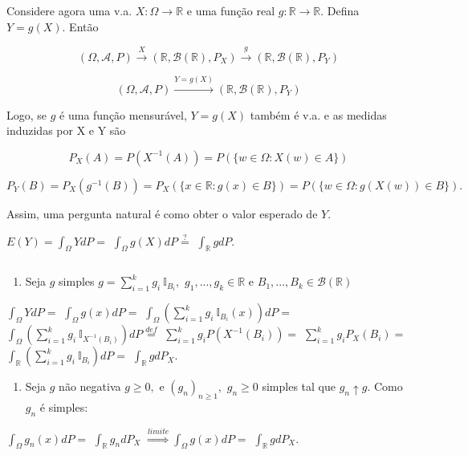 \documentclass[
]{book}
\providecommand{\tightlist}{%
  \setlength{\itemsep}{0pt}\setlength{\parskip}{0pt}}
\begin{document}
Considere agora uma v.a. \(X: \Omega \longrightarrow \mathbb{R}\) e uma função real \(g: \mathbb{R} \longrightarrow \mathbb{R}\). Defina \(Y = g(X)\). Então

\[(\Omega, \mathcal{A},P) \overset{X}{\longrightarrow}(\mathbb{R},\mathcal{B}(\mathbb{R}),P_X)\overset{g}{\longrightarrow}(\mathbb{R},\mathcal{B}(\mathbb{R}),P_Y)\]

\[(\Omega, \mathcal{A},P)\overset{Y = g(X)}{\longrightarrow}(\mathbb{R},\mathcal{B}(\mathbb{R}),P_Y)\]

Logo, se \(g\) é uma função mensurável, \(Y=g(X)\) também é v.a. e as medidas induzidas por X e Y são

\[P_X(A) = P(X^{-1}(A)) = P\left(\{w \in \Omega : X(w) \in A\}\right)\]

\[P_Y(B) = P_X(g^{-1}(B)) = P_X\left(\{x \in \mathbb{R} : g(x) \in B\}\right) = P\left(\{w \in \Omega : g\left(X(w)\right) \in B\}\right).\]

Assim, uma pergunta natural é como obter o valor esperado de \(Y\).

\(E(Y) = \int_\Omega YdP=\) \(\int_\Omega g(X)dP \overset{?}{=}\) \(\int_{\mathbb{R}}gdP.\)

\(~\)

\begin{enumerate}
\def\labelenumi{(\arabic{enumi})}
\tightlist
\item
  Seja \(g\) simples \(g = \sum_{i=1}^kg_i~\mathbb{I}_{B_i},\) \(g_1,...,g_k \in \mathbb{R}\) e \(B_1,...,B_k \in \mathcal{B}(\mathbb{R})\)
\end{enumerate}

\(\int_\Omega YdP =\) \(\int_\Omega g(x)dP=\) \(\int_\Omega \left(\sum_{i=1}^k g_i ~\mathbb{I}_{B_i}(x)\right)dP=\) \(\int_\Omega \left(\sum_{i=1}^k g_i ~\mathbb{I}_{X^{-1}(B_i)}\right)dP \overset{def}{=}\) \(\sum_{i=1}^kg_iP(X^{-1}(B_i))=\) \(\sum_{i=1}^kg_iP_X(B_i)=\) \(\int_{\mathbb{R}}\left(\sum_{i=1}^kg_i~\mathbb{I}_{B_i}\right)dP=\) \(\int_{\mathbb{R}} gdP_X.\)

\begin{enumerate}
\def\labelenumi{(\arabic{enumi})}
\setcounter{enumi}{1}
\tightlist
\item
  Seja \(g\) não negativa \(g \geq 0,\) e \((g_n)_{n\geq1},\) \(g_n \geq 0\) simples tal que \(g_n\uparrow g.\) Como \(g_n\) é simples:
\end{enumerate}

\(\int_\Omega g_n(x)dP=\) \(\int_{\mathbb{R}}g_ndP_X\) \(\overset{ limite}{\Rightarrow} \int_\Omega g(x)dP=\) \(\int_{\mathbb{R}}gdP_X.\)
\end{document}
